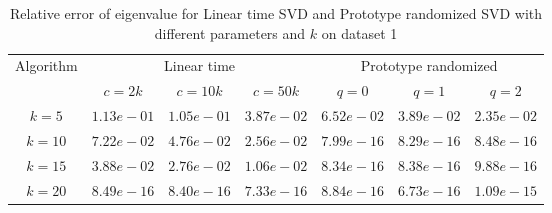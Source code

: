 \begin{table}\label{sigma1}
\centering
\begin{tabular}{|c|c|c|c|c|c|c|}

\hline
\multirow{2}{*}{ Algorithm} &\multicolumn{3}{c|}{Linear time} &\multicolumn{3}{c|}{Prototype randomized}\\\cline{2-7}
 &$c=2k$ &$c=10k$ &$c=50k$ &$q=0$ &$q=1$ &$q=2$\\\hline
$k=5$ & $1.13e-01$ & $1.05e-01$ & $3.87e-02$ & $6.52e-02$ & $3.89e-02$ & $2.35e-02$\\\hline
$k=10$ & $7.22e-02$ & $4.76e-02$ & $2.56e-02$ & $7.99e-16$ & $8.29e-16$ & $8.48e-16$\\\hline
$k=15$ & $3.88e-02$ & $2.76e-02$ & $1.06e-02$ & $8.34e-16$ & $8.38e-16$ & $9.88e-16$\\\hline
$k=20$ & $8.49e-16$ & $8.40e-16$ & $7.33e-16$ & $8.84e-16$ & $6.73e-16$ & $1.09e-15$\\\hline
\end{tabular}
\caption{Relative error of eigenvalue for Linear time SVD and Prototype randomized SVD with different parameters and $k$ on dataset 1}
\end{table}
